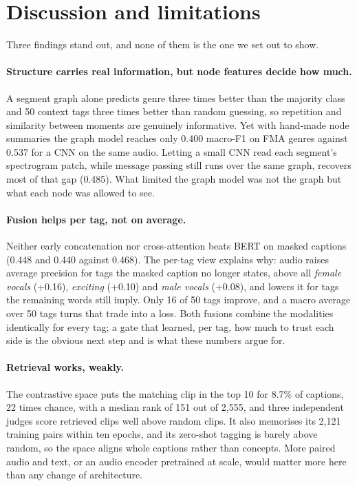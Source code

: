 \documentclass{article}
\begin{document}
\section{Discussion and limitations}

Three findings stand out, and none of them is the one we set out to show.

\paragraph{Structure carries real information, but node features decide how much.}
A segment graph alone predicts genre three times better than the majority class and 50 context tags three times better
than random guessing, so repetition and similarity between moments are genuinely informative. Yet with hand-made node
summaries the graph model reaches only 0.400 macro-F1 on FMA genres against 0.537 for a CNN on the same audio. Letting
a small CNN read each segment's spectrogram patch, while message passing still runs over the same graph, recovers most
of that gap (0.485). What limited the graph model was not the graph but what each node was allowed to see.

\paragraph{Fusion helps per tag, not on average.}
Neither early concatenation nor cross-attention beats BERT on masked captions (0.448 and 0.440 against 0.468). The
per-tag view explains why: audio raises average precision for tags the masked caption no longer states, above all
\emph{female vocals} (+0.16), \emph{exciting} (+0.10) and \emph{male vocals} (+0.08), and lowers it for tags the
remaining words still imply. Only 16 of 50 tags improve, and a macro average over 50 tags turns that trade into a
loss. Both fusions combine the modalities identically for every tag; a gate that learned, per tag, how much to trust
each side is the obvious next step and is what these numbers argue for.

\paragraph{Retrieval works, weakly.}
The contrastive space puts the matching clip in the top 10 for 8.7\% of captions, 22 times chance, with a median rank
of 151 out of 2,555, and three independent judges score retrieved clips well above random clips. It also memorises its
2,121 training pairs within ten epochs, and its zero-shot tagging is barely above random, so the space aligns whole
captions rather than concepts. More paired audio and text, or an audio encoder pretrained at scale, would matter more
here than any change of architecture.
\end{document}
